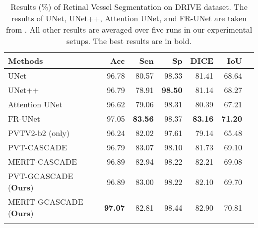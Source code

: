 \documentclass[10pt,twocolumn,letterpaper]{article}
\begin{document}
\begin{table}[t]
\color{black}
\centering 
    {\begin{adjustbox}{width=0.48\textwidth}
{\begin{tabular}{lrrrrrr}
\toprule
Methods      & Acc & Sen & Sp & DICE & IoU \\
\midrule
UNet \cite{ronneberger2015u}                    &  96.78 &  80.57 & 98.33 & 81.41 &   68.64 \\
UNet++ \cite{zhou2018unet++}                    &  96.79 &  78.91 & \textbf{98.50} & 81.14 &   68.27 \\
Attention UNet \cite{oktay2018attention}                    &  96.62 &  79.06 & 98.31 & 80.39 &   67.21 \\
FR-UNet \cite{liu2022full}                    &  97.05 &  \textbf{83.56} & 98.37 & \textbf{83.16} &   \textbf{71.20} \\
PVTV2-b2 (only) \cite{wang2022pvt}                    & 96.24 & 82.02 & 97.61 & 79.14 & 65.48  \\
PVT-CASCADE \cite{Rahman_2023_WACV}                   & 96.79 & 83.07 & 98.10 & 81.73 &  69.10 \\

MERIT-CASCADE \cite{rahman2023multi}                              & 96.89 &  82.94 & 98.22 & 82.21 & 69.08   \\
\midrule 
PVT-GCASCADE (\textbf{Ours})                     & 96.89 & 83.00 & 98.22 & 82.10 &   69.70    \\
MERIT-GCASCADE (\textbf{Ours})                & \textbf{97.07} & 82.81     & 98.44 & 82.90 &   70.81 \\
\bottomrule \\
\end{tabular}}
\end{adjustbox}

}\caption{Results (\%) of Retinal Vessel Segmentation on DRIVE dataset. The results of UNet, UNet++, Attention UNet, and FR-UNet are taken from \cite{liu2022full}. All other results are averaged over five runs in our experimental setups. The best results are in bold.}
\label{tab:results_drive}
\color{black}
\end{table}
\end{document}

